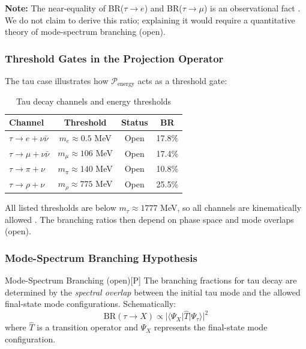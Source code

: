 \textbf{Note:} The near-equality of BR($\tau \to e$) and BR($\tau \to \mu$)
is an observational fact \tagBL{}. We do not claim to derive this ratio;
explaining it would require a quantitative theory of mode-spectrum
branching (open).


\subsubsection{Threshold Gates in the Projection Operator}

The tau case illustrates how $\mathcal{P}_{\mathrm{energy}}$ acts as a threshold gate:

\begin{table}[htbp]
\centering
\caption{Tau decay channels and energy thresholds \tagBL{}}
\label{tab:tau-thresholds}
\begin{tabular}{lccc}
\toprule
\textbf{Channel} & \textbf{Threshold} & \textbf{Status} & \textbf{BR} \\
\midrule
$\tau \to e + \nu\bar\nu$ & $m_e \approx 0.5$ MeV & Open & 17.8\% \\
$\tau \to \mu + \nu\bar\nu$ & $m_\mu \approx 106$ MeV & Open & 17.4\% \\
$\tau \to \pi + \nu$ & $m_\pi \approx 140$ MeV & Open & 10.8\% \\
$\tau \to \rho + \nu$ & $m_\rho \approx 775$ MeV & Open & 25.5\% \\
\bottomrule
\end{tabular}
\end{table}

All listed thresholds are below $m_\tau \approx 1777$ MeV, so all channels are
kinematically allowed \tagBL{}. The branching ratios then depend on phase space and mode
overlaps (open).


\subsubsection{Mode-Spectrum Branching Hypothesis}

\begin{edcPostulateBox}{Mode-Spectrum Branching (open)}{[P]}
The branching fractions for tau decay are determined by the
\emph{spectral overlap} between the initial tau mode and the allowed
final-state mode configurations. Schematically:
\begin{equation}
    \mathrm{BR}(\tau \to X) \propto |\langle \Psi_X | \hat{T} | \Psi_\tau \rangle|^2
    \label{eq:tau-spectral-overlap}
\end{equation}
where $\hat{T}$ is a transition operator and $\Psi_X$ represents the
final-state mode configuration.
\end{edcPostulateBox}

